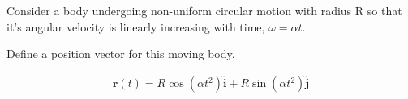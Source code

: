 Consider a body undergoing non-uniform circular motion with radius R so that it’s angular velocity
is linearly increasing with time, $\omega = \alpha t$.

Define a position vector for this moving body.

\begin{solution}
\begin{align*}
    \boldsymbol{r}(t) = R\cos\left(\alpha t^2\right) \hat{\boldsymbol{i}} + R\sin\left(\alpha t^2\right) \hat{\boldsymbol{j}}
\end{align*}
\end{solution}